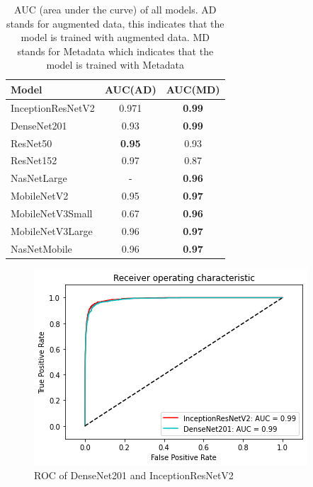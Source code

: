 \documentclass[sensors,article,submit,pdftex,moreauthors]{Definitions/mdpi}
\begin{document}
	\begin{table}[H]
		\centering
		\begin{tabular}{| l | c  c | }
			\hline
			Model & AUC(AD) & AUC(MD)\\ 
			\hline
			InceptionResNetV2 & 0.971 & \textbf{0.99}\\
			\hline
			DenseNet201 & 0.93 & \textbf{0.99}\\
			\hline
			ResNet50 & \textbf{0.95} & 0.93 \\
			\hline
			ResNet152 & 0.97 & 0.87\\
			\hline
			NasNetLarge & - & \textbf{0.96}\\
			\hline
			MobileNetV2 & 0.95 & \textbf{0.97}\\
			\hline
			MobileNetV3Small & 0.67 & \textbf{0.96}\\
			\hline
			MobileNetV3Large & 0.96 & \textbf{0.97}\\
			\hline
			NasNetMobile & 0.96 & \textbf{0.97}\\
			\hline
		\end{tabular}
		\caption{AUC (area under the curve) of all models. AD stands for augmented data, this indicates that the model is trained with augmented data. MD stands for Metadata which indicates that the model is trained with Metadata}
		\label{table:overall-auc}
	\end{table}
	
	\begin{figure}[!htb]
		\centering
		\includegraphics[width=1\linewidth]{Definitions/ROC/denvsirv2}
		\caption{ROC of DenseNet201 and InceptionResNetV2}\label{fig:densevsirv2}
	\end{figure}
	
\end{document}
